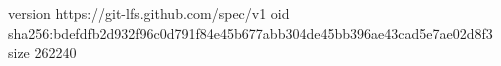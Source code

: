 version https://git-lfs.github.com/spec/v1
oid sha256:bdefdfb2d932f96c0d791f84e45b677abb304de45bb396ae43cad5e7ae02d8f3
size 262240
